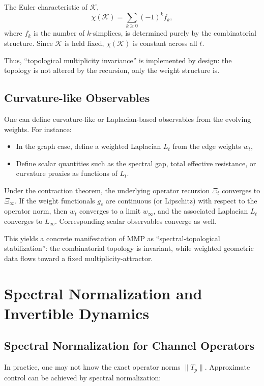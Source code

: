 \documentclass[12pt]{article}
\begin{document}
The Euler characteristic of \(\mathcal{K}\),
\[
  \chi(\mathcal{K}) = \sum_{k\ge 0} (-1)^k f_k,
\]
where \(f_k\) is the number of \(k\)-simplices, is determined purely by the combinatorial structure. Since \(\mathcal{K}\) is held fixed, \(\chi(\mathcal{K})\) is constant across all \(t\).

Thus, ``topological multiplicity invariance'' is implemented by design: the topology is not altered by the recursion, only the weight structure is.

\subsection{Curvature-like Observables}

One can define curvature-like or Laplacian-based observables from the evolving weights. For instance:

\begin{itemize}
  \item In the graph case, define a weighted Laplacian \(L_t\) from the edge weights \(w_t\),  
  \item Define scalar quantities such as the spectral gap, total effective resistance, or curvature proxies as functions of \(L_t\).
\end{itemize}

Under the contraction theorem, the underlying operator recursion \(\Xi_t\) converges to \(\Xi_\infty\). If the weight functionals \(g_e\) are continuous (or Lipschitz) with respect to the operator norm, then \(w_t\) converges to a limit \(w_\infty\), and the associated Laplacian \(L_t\) converges to \(L_\infty\). Corresponding scalar observables converge as well.

This yields a concrete manifestation of MMP as ``spectral-topological stabilization'': the combinatorial topology is invariant, while weighted geometric data flows toward a fixed multiplicity-attractor.

\newpage

\section{Spectral Normalization and Invertible Dynamics}

\subsection{Spectral Normalization for Channel Operators}

In practice, one may not know the exact operator norms \(\|T_p\|\). Approximate control can be achieved by spectral normalization:
\end{document}
